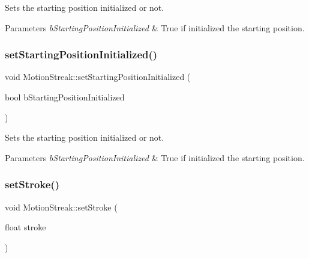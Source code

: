 Sets the starting position initialized or not.


\begin{DoxyParams}{Parameters}
{\em b\+Starting\+Position\+Initialized} & True if initialized the starting position. \\
\hline
\end{DoxyParams}
\mbox{\label{classMotionStreak_af5c5821339dbf85b0ec3277316a04198}} 
\subsubsection{\texorpdfstring{set\+Starting\+Position\+Initialized()}{setStartingPositionInitialized()}\hspace{0.1cm}{\footnotesize\ttfamily [2/2]}}
{\footnotesize\ttfamily void Motion\+Streak\+::set\+Starting\+Position\+Initialized (\begin{DoxyParamCaption}\item[{bool}]{b\+Starting\+Position\+Initialized }\end{DoxyParamCaption})\hspace{0.3cm}{\ttfamily [inline]}}

Sets the starting position initialized or not.


\begin{DoxyParams}{Parameters}
{\em b\+Starting\+Position\+Initialized} & True if initialized the starting position. \\
\hline
\end{DoxyParams}
\mbox{\label{classMotionStreak_abba05cb77e5d622147577add730d15b9}} 
\subsubsection{\texorpdfstring{set\+Stroke()}{setStroke()}\hspace{0.1cm}{\footnotesize\ttfamily [1/2]}}
{\footnotesize\ttfamily void Motion\+Streak\+::set\+Stroke (\begin{DoxyParamCaption}\item[{float}]{stroke }\end{DoxyParamCaption})\hspace{0.3cm}{\ttfamily [inline]}}

